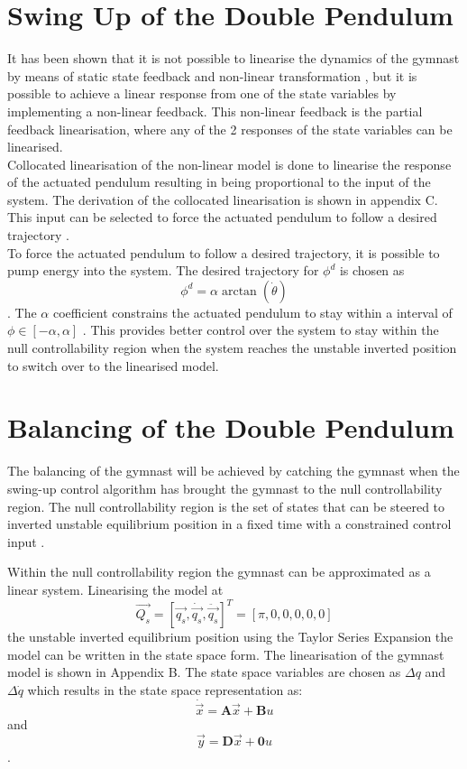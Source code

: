 \documentclass[a4paper,12pt]{article}
\begin{document}
	
	
	\section{Swing Up of the Double Pendulum}
	
	It has been shown that it is not possible to linearise the dynamics of the gymnast by means of static state feedback and non-linear transformation \cite{murray}, but it is possible to achieve a linear response from one of the state variables by implementing a non-linear feedback. This non-linear feedback is the partial feedback linearisation, where any of the 2 responses of the state variables can be linearised. 
	\\
	
	Collocated linearisation of the non-linear model is done to linearise the response of the actuated pendulum resulting in being proportional to the input of the system. The derivation of the collocated linearisation is shown in appendix C. This input can be selected to force the actuated pendulum to follow a desired trajectory \cite{spong_swingup}. 
	\\
	
	To force the actuated pendulum to follow a desired trajectory, it is possible to pump energy into the system. The desired trajectory for ${\phi}^{d}$ is chosen as $${\phi}^{d} = \alpha \arctan(\dot{\theta}) $$ \cite{spong_swingup}. The $\alpha$ coefficient constrains the actuated pendulum to stay within a interval of $ \phi \in [-\alpha,\alpha] $ \cite{spong_swingup}. This provides better control over the system to stay within the null controllability region when the system reaches the unstable inverted position to switch over to the linearised model. 
	
		  
	\section{Balancing of the Double Pendulum}
	
	The balancing of the gymnast will be achieved by catching the gymnast when the swing-up control algorithm has brought the gymnast to the null controllability region. The null controllability region is the set of states that can be steered to inverted unstable equilibrium position in a fixed time with a constrained control input \cite{null_controllability}.
	
	Within the null controllability region the gymnast can be approximated as a linear system. Linearising the model at $$\vec{Q_{s}} = [\vec{q_{s}},\dot{\vec{q_{s}}},\ddot{\vec{q_{s}}}]^{T}=[\pi,0,0,0,0,0]$$ the unstable inverted equilibrium position using the Taylor Series Expansion the model can be written in the state space form. The linearisation of the gymnast model is shown in Appendix B. The state space variables are chosen as $\Delta{q}$ and $\Delta{\dot{q}}$ which results in the state space representation as:  $$ \dot{\vec{x}} = \boldsymbol{A}\vec{x} + \boldsymbol{B}u $$ and $$ \vec{y} = \boldsymbol{D}\vec{x} + \boldsymbol{0}u $$.
	
\end{document}
